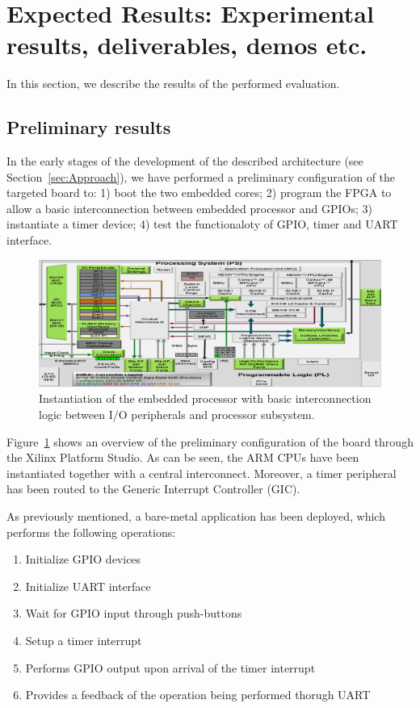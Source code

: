 \section{Expected Results: Experimental results, deliverables, demos etc.}

In this section, we describe the results of the performed evaluation.

\subsection{Preliminary results}

In the early stages of the development of the described architecture
(see Section~\ref{sec:Approach}), we have performed a preliminary
configuration of the targeted board to: 1) boot the two embedded
cores; 2) program the FPGA to allow a basic interconnection between
embedded processor and GPIOs; 3) instantiate a timer device; 4) test
the functionaloty of GPIO, timer and UART interface.

\begin{figure}[t]
  \centering
  \includegraphics[width=1\textwidth]{fig/proc_bare.png}
  \caption{Instantiation of the embedded processor with basic
    interconnection logic between I/O peripherals and processor
    subsystem.}
  \label{fig:proc}
\end{figure}

Figure~\ref{fig:proc} shows an overview of the preliminary
configuration of the board through the Xilinx Platform Studio. As can
be seen, the ARM CPUs have been instantiated together with a central
interconnect. Moreover, a timer peripheral has been routed to the
Generic Interrupt Controller (GIC).

As previously mentioned, a bare-metal application has been deployed,
which performs the following operations:

\begin{enumerate}
\item Initialize GPIO devices
\item Initialize UART interface
\item Wait for GPIO input through push-buttons
\item Setup a timer interrupt
\item Performs GPIO output upon arrival of the timer interrupt
\item Provides a feedback of the operation being performed thorugh
  UART
\end{enumerate}

